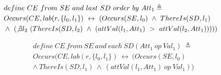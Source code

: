 \begin{align*}%
&define\ CE\ from\ SE\ and\ last\ SD\ order\ by\ Att_1\triangleq\\
&Occurs(CE, lab(r, \{l_0, l_1\})\ \leftrightarrow\ (Occurs(SE, l_0)\ \wedge\ ThereIs(SD, l_1)\\
&\wedge\ (\not \exists l_2\ (ThereIs(SD, l_2)\ \wedge\ (attVal(l_1, Att_1)\ >\ attVal(l_2, Att_1)))))
\end{align*}

\begin{align*}%
&define\ CE\ from\ SE\ and\ each\ SD(Att_1\ op \ Val_1)\ \triangleq\\
&Occurs(CE, lab(r, \{l_0, l_1\})\ \leftrightarrow\ (Occurs(SE, l_0)\\
&\wedge\ ThereIs(SD, l_1)\ \wedge\ (attVal(l_1, Att_1)\ op\ Val_1))
\end{align*}
